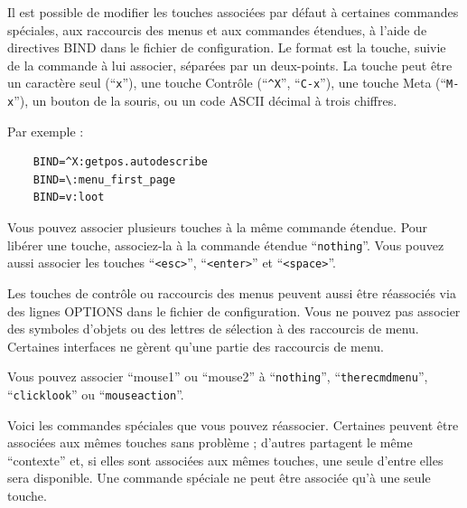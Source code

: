 \documentclass[titlepage]{article}
\begin{document}
Il est possible de modifier les touches associées par défaut à certaines commandes
spéciales, aux raccourcis des menus et aux commandes étendues, à l'aide de
directives BIND dans le fichier de configuration. Le format est la touche, suivie
de la commande à lui associer, séparées par un deux-points. La touche peut être un caractère seul (``\texttt{x}''),
une touche Contrôle (``\texttt{\textasciicircum X}'', ``\texttt{C-x}''), une touche Meta (``\texttt{M-x}''),
un bouton de la souris, ou un code ASCII décimal à trois chiffres.

Par exemple :

\begin{verbatim}
    BIND=^X:getpos.autodescribe
    BIND=\:menu_first_page
    BIND=v:loot
\end{verbatim}

\begin{description}[font=\mdseries\ttfamily]
\item[Touches des commandes étendues]
Vous pouvez associer plusieurs touches à la même commande étendue. Pour libérer
une touche, associez-la à la commande étendue ``\texttt{nothing}''. Vous pouvez aussi associer
les touches ``\texttt{<esc>}'', ``\texttt{<enter>}'' et ``\texttt{<space>}''.

\item[Raccourcis des menus]
Les touches de contrôle ou raccourcis des menus peuvent aussi être réassociés
via des lignes OPTIONS dans le fichier de configuration.
Vous ne pouvez pas associer des symboles d'objets ou des lettres de sélection
à des raccourcis de menu.
Certaines interfaces ne gèrent qu'une partie des raccourcis de menu.

\item[Boutons de la souris]
Vous pouvez associer ``mouse1'' ou ``mouse2'' à ``\texttt{nothing}'',
``\texttt{therecmdmenu}'', ``\texttt{clicklook}'' ou ``\texttt{mouseaction}''.

\item[Touches des commandes spéciales]
Voici les commandes spéciales que vous pouvez réassocier. Certaines peuvent être associées aux
mêmes touches sans problème ; d'autres partagent le même ``contexte'' et, si elles sont
associées aux mêmes touches, une seule d'entre elles sera disponible. Une commande spéciale
ne peut être associée qu'à une seule touche.
\end{description}
\end{document}
